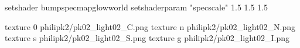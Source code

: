 setshader bumpspecmapglowworld
setshaderparam "specscale" 1.5 1.5 1.5


texture 0 philipk2/pk02_light02_C.png
texture n philipk2/pk02_light02_N.png
texture s philipk2/pk02_light02_S.png
texture g philipk2/pk02_light02_I.png

